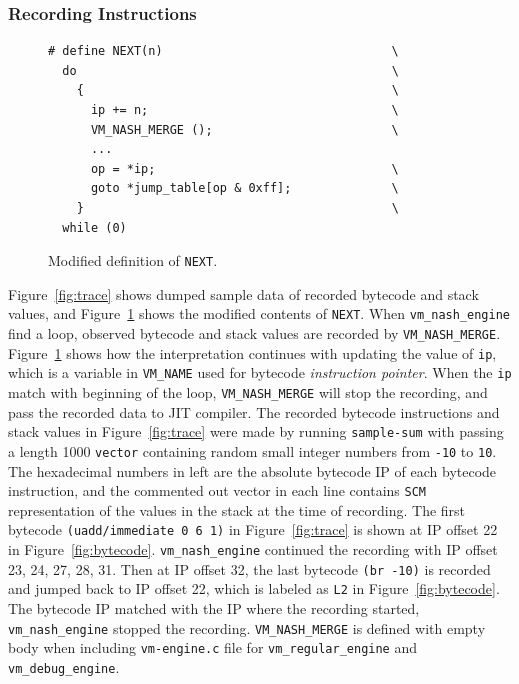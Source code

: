 \documentclass[preprint]{sigplanconf}
\begin{document}
\subsubsection{Recording Instructions}

\begin{figure}
\begin{verbatim}
# define NEXT(n)                                \
  do                                            \
    {                                           \
      ip += n;                                  \
      VM_NASH_MERGE ();                         \
      ...
      op = *ip;                                 \
      goto *jump_table[op & 0xff];              \
    }                                           \
  while (0)
\end{verbatim}
\caption{Modified definition of \texttt{NEXT}.}
\label{fig:cnext}
\end{figure}

Figure~\hyperref[fig:trace]{\ref{fig:trace}} shows dumped sample data of
recorded bytecode and stack values, and
Figure~\hyperref[fig:cnext]{\ref{fig:cnext}} shows the modified contents of
\texttt{NEXT}. When \texttt{vm\_nash\_engine} find a loop, observed bytecode and
stack values are recorded by
\texttt{VM\_NASH\_MERGE}. Figure~\hyperref[fig:cnext]{\ref{fig:cnext}} shows how
the interpretation continues with updating the value of \texttt{ip}, which is a
variable in \texttt{VM\_NAME} used for bytecode \textit{instruction
  pointer}. When the \texttt{ip} match with beginning of the loop,
\texttt{VM\_NASH\_MERGE} will stop the recording, and pass the recorded data to
JIT compiler. The recorded bytecode instructions and stack values in
Figure~\hyperref[fig:trace]{\ref{fig:trace}} were made by running
\texttt{sample-sum} with passing a length 1000 \texttt{vector} containing random
small integer numbers from \texttt{-10} to \texttt{10}. The hexadecimal numbers
in left are the absolute bytecode IP of each bytecode instruction, and the
commented out vector in each line contains \texttt{SCM} representation of the
values in the stack at the time of recording.  The first bytecode
\texttt{(uadd/immediate 0 6 1)} in Figure~\hyperref[fig:trace]{\ref{fig:trace}}
is shown at IP offset 22 in
Figure~\hyperref[fig:bytecode]{\ref{fig:bytecode}}. \texttt{vm\_nash\_engine}
continued the recording with IP offset 23, 24, 27, 28, 31. Then at IP offset 32,
the last bytecode \texttt{(br -10)} is recorded and jumped back to IP offset 22,
which is labeled as \texttt{L2} in
Figure~\hyperref[fig:bytecode]{\ref{fig:bytecode}}. The bytecode IP matched with
the IP where the recording started, \texttt{vm\_nash\_engine} stopped the
recording. \texttt{VM\_NASH\_MERGE} is defined with empty body when including
\texttt{vm-engine.c} file for \texttt{vm\_regular\_engine} and
\texttt{vm\_debug\_engine}.
\end{document}
